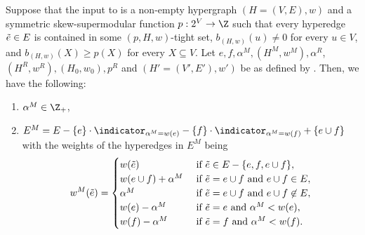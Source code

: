 \begin{lemma}\label{lem:WeakToStrong:properties-of-alpha^M-and-alpha^R}
    Suppose that the input to  is a non-empty hypergraph $(H = (V, E), w)$ and a symmetric skew-supermodular function $p:2^V\rightarrow \Z$ 
such that every hyperedge $\Tilde{e} \in E$ is contained in some $(p, H, w)$-tight set, $b_{(H,w)}(u) \not = 0$ for every $u \in V$, and $b_{(H,w)}(X) \geq p(X)$ for every $X \subseteq V$. 
    Let $e, f, \alpha^M, (H^M, w^M), \alpha^R$, $(H^R, w^R),(H_0, w_0), p^R$ and $(H' = (V', E'), w')$ be as defined by . 
    Then, we have the following:
    \begin{enumerate}[label=(\arabic*)]
        \item $\alpha^M \in \Z_+$,
        \item 
        $E^M=E-\{e\}\cdot \indicator_{\alpha^M= w(e)}- \{f\}\cdot \indicator_{\alpha^M = w(f)} + \{e\cup f\}$ with the weights of the hyperedges in $E^M$ being  
        \[
        w^M(\Tilde{e})=
        \begin{cases}
            w(\Tilde{e}) &\text { if } \Tilde{e}\in E-\{e, f, e\cup f\},\\
            w(e\cup f) + \alpha^M &\text { if } \Tilde{e}=e\cup f \text{ and } e\cup f \in E, \\
            \alpha^M &\text { if } \Tilde{e}=e\cup f \text{ and } e\cup f \not \in E, \\
            w(e) - \alpha^M &\text { if } \Tilde{e}=e \text{ and } \alpha^M<w(e), \\
            w(f) - \alpha^M &\text { if } \Tilde{e}=f \text{ and } \alpha^M<w(f).
        \end{cases}
        \]

\end{enumerate}
\end{lemma}
